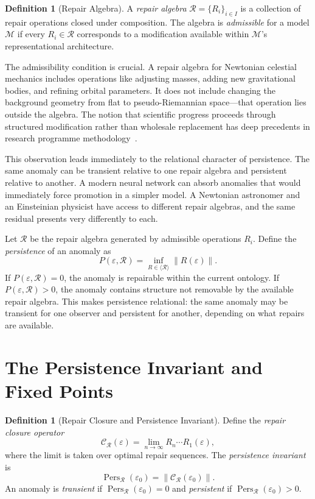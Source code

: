 \documentclass[12pt,oneside]{book}
\theoremstyle{plain}
\theoremstyle{definition}
\newtheorem{definition}[theorem]{Definition}
\theoremstyle{remark}
\DeclareMathOperator{\Pers}{Pers}
\newcommand{\R}{\mathcal{R}}
\newcommand{\M}{\mathcal{M}}
\newcommand{\eps}{\varepsilon}
\newcommand{\norm}[1]{\left\lVert #1 \right\rVert}
\newcommand{\1}{\mathbf{1}}
\begin{document}
\begin{definition}[Repair Algebra]
A \emph{repair algebra} $\R = \{R_i\}_{i \in I}$ is a collection of repair operations closed under composition. The algebra is \emph{admissible} for a model $\M$ if every $R_i \in \R$ corresponds to a modification available within $\M$'s representational architecture.
\end{definition}

The admissibility condition is crucial. A repair algebra for Newtonian celestial mechanics includes operations like adjusting masses, adding new gravitational bodies, and refining orbital parameters. It does not include changing the background geometry from flat to pseudo-Riemannian space---that operation lies outside the algebra. The notion that scientific progress proceeds through structured modification rather than wholesale replacement has deep precedents in research programme methodology~\cite{lakatos1978}.

This observation leads immediately to the relational character of persistence. The same anomaly can be transient relative to one repair algebra and persistent relative to another. A modern neural network can absorb anomalies that would immediately force promotion in a simpler model. A Newtonian astronomer and an Einsteinian physicist have access to different repair algebras, and the same residual presents very differently to each.

\begin{derivbox}[frametitle={Derivation 2: Persistence Relative to a Repair Algebra}]
Let $\R$ be the repair algebra generated by admissible operations $R_i$. Define the \emph{persistence} of an anomaly as
\[
P(\eps, \R) = \inf_{R \in \langle \R \rangle} \norm{R(\eps)}.
\]
If $P(\eps, \R) = 0$, the anomaly is repairable within the current ontology. If $P(\eps, \R) > 0$, the anomaly contains structure not removable by the available repair algebra. This makes persistence relational: the same anomaly may be transient for one observer and persistent for another, depending on what repairs are available.
\end{derivbox}

\section{The Persistence Invariant and Fixed Points}

\begin{definition}[Repair Closure and Persistence Invariant]
Define the \emph{repair closure operator}
\[
\mathcal{C}_{\R}(\eps) = \lim_{n\to\infty} R_n \cdots R_1(\eps),
\]
where the limit is taken over optimal repair sequences. The \emph{persistence invariant} is
\[
\Pers_{\R}(\eps_0) = \norm{\mathcal{C}_{\R}(\eps_0)}.
\]
An anomaly is \emph{transient} if $\Pers_{\R}(\eps_0) = 0$ and \emph{persistent} if $\Pers_{\R}(\eps_0) > 0$.
\end{definition}
\end{document}
